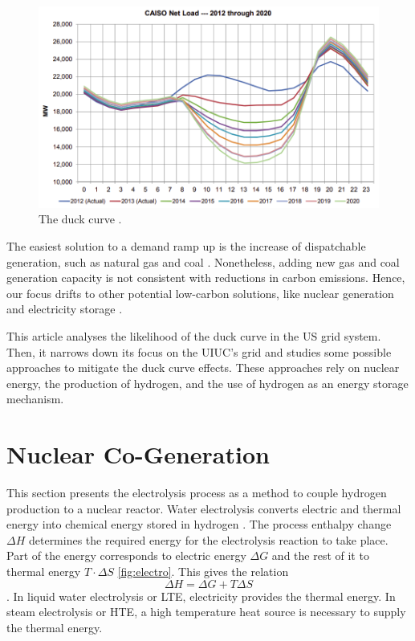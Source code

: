 \documentclass{anstrans}
\begin{document}
\begin{figure}[H]
	\centering
	\includegraphics[width=0.7\linewidth]{figures/caiso-duck.png}
	\hfill
	\caption{The duck curve \cite{bouillon_prepared_2014}.}
	\label{fig:duck}
\end{figure}

The easiest solution to a demand ramp up is the increase of dispatchable generation, such as natural gas and coal \cite{bouillon_prepared_2014}.
Nonetheless, adding new gas and coal generation capacity is not consistent with reductions in carbon emissions.
Hence, our focus drifts to other potential low-carbon solutions, like nuclear generation and electricity storage \cite{ming_resource_2019}.

This article analyses the likelihood of the duck curve in the \gls{US} grid system. Then, it narrows down its focus on the \gls{UIUC}'s grid and studies some possible approaches to mitigate the duck curve effects. These approaches rely on nuclear energy, the production of hydrogen, and the use of hydrogen as an energy storage mechanism. 


\section{Nuclear Co-Generation}
\label{section:hydroprod}

This section presents the electrolysis process as a method to couple hydrogen production to a nuclear reactor.
Water electrolysis converts electric and thermal energy into chemical energy stored in hydrogen \cite{hi2h2_highly_2007}.
The process enthalpy change $\Delta H$ determines the required energy for the electrolysis reaction to take place.
Part of the energy corresponds to electric energy $\Delta G$ and the rest of it to thermal energy $T \cdot \Delta S$ \ref{fig:electro}.
This gives the relation
\begin{equation}
\Delta H = \Delta G + T \Delta S
\end{equation}
.
In liquid water electrolysis or \gls{LTE}, electricity provides the thermal energy.
In steam electrolysis or \gls{HTE}, a high temperature heat source is necessary to supply the thermal energy.
\end{document}
